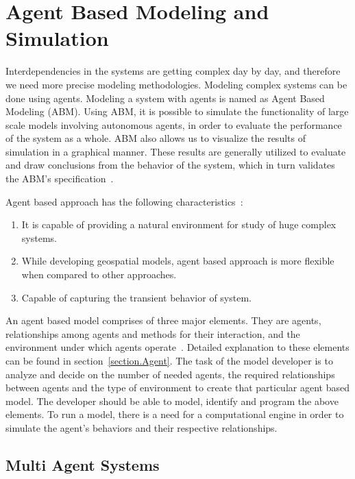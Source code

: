\chapter{Agent Based Modeling and Simulation}
\label{Chapter.three}

Interdependencies in the systems are getting complex day by day, and therefore we need more precise modeling methodologies. Modeling complex systems can be done using agents. Modeling a system with agents is named as Agent Based Modeling (ABM). Using ABM, it is possible to simulate the functionality of large scale models involving autonomous agents, in order to evaluate the performance of the system as a whole. ABM also allows us to visualize the results of simulation in a graphical manner. These results are generally utilized to evaluate and draw conclusions from the behavior of the system, which in turn validates the ABM's specification~\cite{Barbosa2011}. 

\vspace{3mm}
Agent based approach has the following characteristics~\cite{christian06}:

\begin{enumerate}
\item It is capable of providing a natural environment for study of huge complex systems.
\item While developing geospatial models, agent based approach is more flexible when compared to other approaches.
\item Capable of capturing the transient behavior of system.
\end{enumerate}

\vspace{5mm}

An agent based model comprises of three major elements. They are agents, relationships among agents and methods for their interaction, and the environment under which agents operate~\cite{macal2010}. Detailed explanation to these elements can be found in section~\ref{section.Agent}. The task of the model developer is to analyze and decide on the number of needed agents, the required relationships between agents and the type of environment to create that particular agent based model. The developer should be able to model, identify and program the above elements. To run a model, there is a need for a computational engine in order to simulate the agent's behaviors and their respective relationships.

\section{Multi Agent Systems}


